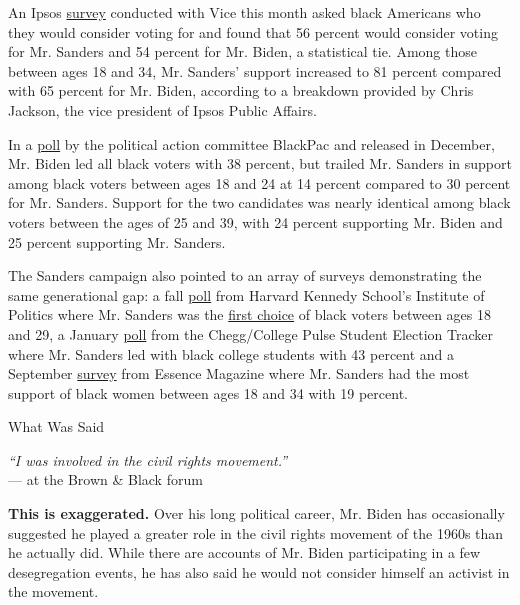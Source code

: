 An Ipsos
\href{https://www.vice.com/en_us/article/z3bnvw/exclusive-poll-just-as-many-african-americans-say-theyd-consider-voting-for-bernie-sanders-as-joe-biden}{survey}
conducted with Vice this month asked black Americans who they would
consider voting for and found that 56 percent would consider voting for
Mr. Sanders and 54 percent for Mr. Biden, a statistical tie. Among those
between ages 18 and 34, Mr. Sanders' support increased to 81 percent
compared with 65 percent for Mr. Biden, according to a breakdown
provided by Chris Jackson, the vice president of Ipsos Public Affairs.

In a
\href{https://www.politico.com/f/?id=0000016e-fc61-d978-a9ee-feff6f6c0000}{poll}
by the political action committee BlackPac and released in December, Mr.
Biden led all black voters with 38 percent, but trailed Mr. Sanders in
support among black voters between ages 18 and 24 at 14 percent compared
to 30 percent for Mr. Sanders. Support for the two candidates was nearly
identical among black voters between the ages of 25 and 39, with 24
percent supporting Mr. Biden and 25 percent supporting Mr. Sanders.

The Sanders campaign also pointed to an array of surveys demonstrating
the same generational gap: a fall
\href{https://iop.harvard.edu/fall-2019-poll}{poll} from Harvard Kennedy
School's Institute of Politics where Mr. Sanders was the
\href{https://docs.google.com/spreadsheets/d/1eLnFSQUAIc5uxT571PXFF217xJX0yleD3T1YebBVOq0/edit\#gid=578521403\&range=A374}{first
choice} of black voters between ages 18 and 29, a January
\href{https://www.chegg.com/press/college-election-tracker/}{poll} from
the Chegg/College Pulse Student Election Tracker where Mr. Sanders led
with black college students with 43 percent and a September
\href{https://www.essence.com/feature/black-womens-roundtable-survey-results-2019/}{survey}
from Essence Magazine where Mr. Sanders had the most support of black
women between ages 18 and 34 with 19 percent.

What Was Said

\emph{``I was involved in the civil rights movement.''}\\
--- at the Brown \& Black forum

\textbf{This is exaggerated.} Over his long political career, Mr. Biden
has occasionally suggested he played a greater role in the civil rights
movement of the 1960s than he actually did. While there are accounts of
Mr. Biden participating in a few desegregation events, he has also said
he would not consider himself an activist in the movement.

